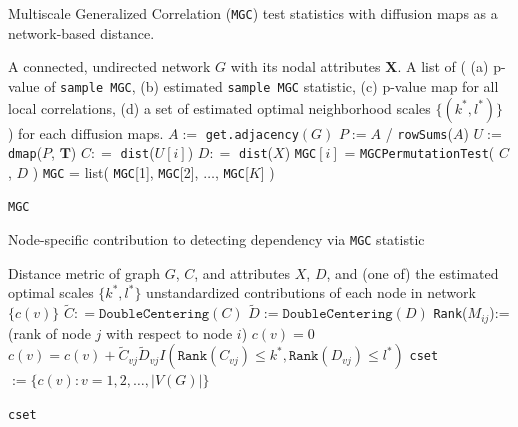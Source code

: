 \documentclass[12pt]{article}
\theoremstyle{definition}
\begin{document}
\begin{algorithm}[H]
	\caption{Multiscale Generalized Correlation (\texttt{MGC}) test statistics with diffusion maps as a network-based distance.}
	\begin{algorithmic}[1]
		\Require A connected, undirected network $G$ with its nodal attributes $\mathbf{X}$.
		\Ensure A list of \big(  (a) p-value of \texttt{sample MGC}, (b) estimated \texttt{sample MGC} statistic, (c) p-value map for all local correlations, (d) a set of estimated optimal neighborhood scales $\{  (k^{*}, l^{*}  ) \}$  \big) for each diffusion maps.
		\State $A :=$ \texttt{get.adjacency}$(G)$
		\State $P := A $ / \texttt{rowSums}($A$) 
		\State $U :=$ \texttt{dmap}($P$, $\mathbf{T}$) 
		\Begin
		\State $C : =$  \texttt{dist}($U[i]$) 
		\State $D : =$ \texttt{dist}($X$) 
		\State \texttt{MGC}$[i]$ = \texttt{MGCPermutationTest}( $C$, $D$ ) 
		\End
		\EndFor
		\State \texttt{MGC} = list( \texttt{MGC}[1], \texttt{MGC}[2], $\ldots$, \texttt{MGC}[$K$]  )
		
		\Return \texttt{MGC}
		\EndFunction
	\end{algorithmic}
\end{algorithm}

\begin{algorithm}[H]
	\caption{Node-specific contribution to detecting dependency via \texttt{MGC} statistic}
	\begin{algorithmic}[1]
		\Require Distance metric of graph $G$, $C$, and attributes $X$, $D$, and (one of) the estimated optimal scales $\{ k^{*}, l^{*} \}$ 
		\Ensure  unstandardized contributions of each node in network $\{  c(v) \}$
		\State $\tilde{C} : = \texttt{DoubleCentering}(C)$
		\State $\tilde{D} := \texttt{DoubleCentering}(D)$
		\State \texttt{Rank}($M_{ij}$):= (rank of node $j$ with respect to node $i$)
		 
		\State $c(v) = 0$
		\Begin
		\State $c(v) =  c(v) + \tilde{C}_{vj} \tilde{D}_{v j} I(  \texttt{Rank}(C_{vj})  \leq k^{*}, \texttt{Rank}(D_{vj}) \leq l^{*} )$
		\End
		\EndFor
		\EndFor
		\State \texttt{cset} $:= \{ c(v) : v = 1,2, \ldots , |V(G)|  \}$	
		
		\Return  \texttt{cset}
		\EndFunction
	\end{algorithmic}
\end{algorithm}
\end{document}
